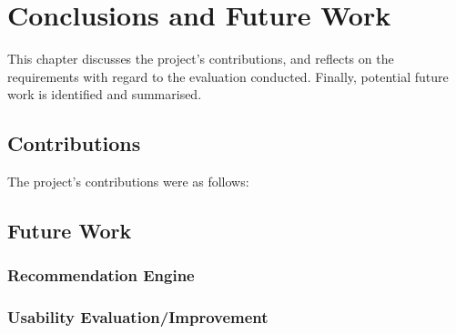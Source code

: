 \chapter{Conclusions and Future Work}
This chapter discusses the project's contributions, and reflects on the requirements with regard to the evaluation conducted. Finally, potential future work is identified and summarised.

\section{Contributions}
The project's contributions were as follows:



\section{Future Work}

\subsection{Recommendation Engine}

\subsection{Usability Evaluation/Improvement}